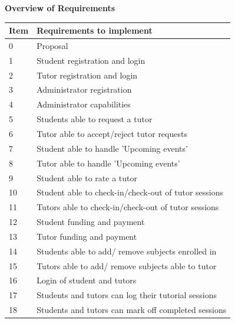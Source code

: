 \documentclass[12pt]{article}
\begin{document}
\begin{flushleft}
\textbf{Overview of Requirements}
\end{flushleft}
{
\centering
\begin{longtable}{| p{1.5cm} | p{13.5cm}|  }
\hline
\textbf{Item} & \textbf{Requirements to implement}

	\\ \hline 0 & Proposal
		\\ \hline 1 & Student registration and login \\ \hline

			2 & Tutor registration and login \\ \hline

			3 & Administrator registration  \\ \hline


			4 & Administrator capabilities\\ \hline

			5 & Students able to request a tutor\\ \hline

				6 & Tutor able to accept/reject tutor requests\\ \hline

				7 & Student able to handle 'Upcoming events'   \\ \hline

				8 & Tutor able to handle 'Upcoming events'  \\ \hline

				9 & Student able to rate a tutor \\ \hline

				10 & Student able to check-in/check-out of tutor sessions  \\ \hline

				11 & Tutors able to check-in/check-out of tutor sessions   \\ \hline

				12 & Student funding and payment \\ \hline
				13 & Tutor funding and payment \\ \hline
				14 & Students able to add/ remove subjects enrolled in\\ \hline
				15 & Tutors able to add/ remove subjects able to tutor\\ \hline
				16 & Login of student and tutors\\ \hline
				17 & Students and tutors can log their tutorial sessions\\ \hline
				18 & Students and tutors can mark off completed sessions\\ \hline


\end{longtable}
}
\end{document}
